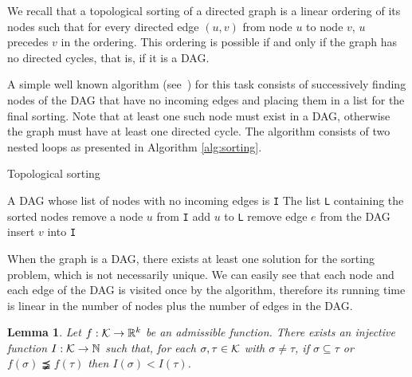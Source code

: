 \documentclass[12pt]{article}
\newtheorem{lem}[thm]{Lemma}
\newcommand{\R}{{\mathbb R}}
\newcommand{\N}{{\mathbb N}}
\newcommand{\cK}{{\cal K}}
\begin{document}
We recall that a topological sorting of a directed graph is a linear ordering of its nodes such that for every directed edge
$(u, v)$ from node $u$ to node $v$, $u$ precedes $v$ in the ordering. This ordering is possible if and only if the graph
has no directed cycles, that is, if it is a  DAG.

A simple well known algorithm (see~\cite{Wikipedia14,Kahn62}) for this task consists
of successively finding nodes of the DAG that have no incoming edges and placing them in a list for the final sorting. Note that
at least one such node must exist in a DAG, otherwise the graph must have at least one directed cycle.
The algorithm consists of two nested loops as presented in Algorithm \ref{alg:sorting}.

\begin{algorithm}
\caption{Topological sorting}
\label{alg:sorting}
\begin{algorithmic}[1]
 A DAG whose list of nodes with no incoming edges is  \texttt{I}
 The list \texttt{L} containing the sorted nodes
\STATE remove a node $u$ from \texttt{I}
\STATE add $u$ to \texttt{L}
\STATE remove edge $e$ from the DAG
\STATE insert $v$ into \texttt{I}
\ENDIF
\ENDFOR
\ENDWHILE
\end{algorithmic}
\end{algorithm}

When the graph is a DAG, there exists at least one solution for the sorting problem, which is not necessarily unique.
We can easily see that each node and each edge of the DAG is visited once by the algorithm, therefore its running time
is linear in the number of nodes plus the number of edges in the DAG.

\begin{lem}\label{lem:index}
Let $f:\cK\to\R^k$ be an admissible function. There exists an injective function $I:{\cK} \to \N$ such that, for each $\sigma, \tau \in {\cK}$ with $\sigma \ne \tau$,
if $\sigma\subseteq \tau$ or $f(\sigma)\precneqq  f(\tau)$ then $I(\sigma)<I(\tau)$.
\end{lem}
\end{document}
